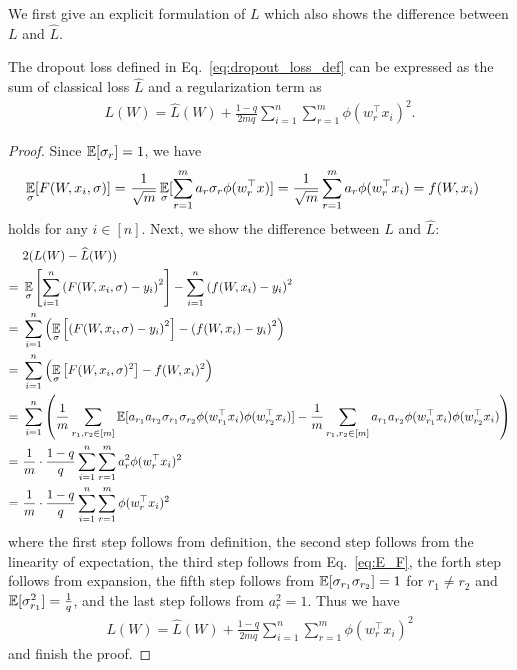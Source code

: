 We first give an explicit formulation of $L$ which also shows the difference between $L$ and $\hat{L}$.%

\begin{lemma}
\label{lem:explicit-regularization}
The dropout loss defined in Eq.~\eqref{eq:dropout_loss_def} can be expressed as the sum of classical loss $\hat{L}$ and a regularization term as
\begin{align}
\label{eq:explicit-regularization}
L(W) = \hat{L}(W) + \frac{1-q}{2mq}\sum_{i=1}^{n} \sum_{r = 1}^{m}\phi(w_r^\top x_i)^{2}.
\end{align}
\end{lemma}

\begin{proof}
Since $\operatorname*{{\mathbb{E}}}[\sigma_r] = 1$, we have
\begin{align}\label{eq:E_F}
    \operatorname*{{\mathbb{E}}}_{\sigma}[F(W, x_i, \sigma)] = & ~ \frac{1}{\sqrt{m}}\operatorname*{{\mathbb{E}}}_{\sigma}[\sum_{r = 1}^{m}a_r \sigma_r\phi(w_{r}^{\top}x)] =  \frac{1}{\sqrt{m}}\sum_{r=1}^{m}a_r\phi(w_r^{\top}x_i) = f(W, x_i)
\end{align}
holds for any $i \in [n]$. Next, we show the difference between $L$ and $\hat{L}$:
\begin{align}
    & ~ 2( L(W) - \widehat{L}(W) ) \notag\\
    = & ~ \operatorname*{{\mathbb{E}}}_{\sigma}\left[\sum_{i = 1}^{n}\left(F(W, x_i, \sigma) - y_i\right)^2\right] -  \sum_{i = 1}^{n}\left(f(W, x_i) - y_i\right)^2\notag\\
    = & ~ \sum_{i = 1}^{n}\left(\operatorname*{{\mathbb{E}}}_{\sigma}\left[\left(F(W, x_i, \sigma) - y_i\right)^2\right] - \left(f(W, x_i) - y_i\right)^2 \right)\notag\\
    = & ~ \sum_{i = 1}^{n}\left(\operatorname*{{\mathbb{E}}}_{\sigma}\left[F(W, x_i, \sigma)^2\right] - f(W, x_i)^2  \right)\notag \\
    = & ~ \sum_{i = 1}^{n}\left(\frac{1}{m}\sum_{r_1, r_2 \in [m]}\operatorname*{{\mathbb{E}}}[a_{r_1}a_{r_2}\sigma_{r_1}\sigma_{r_2}\phi(w_{r_1}^{\top}x_i)\phi(w_{r_2}^{\top}x_i)]- \frac{1}{m}\sum_{r_1, r_2 \in [m]}a_{r_1}a_{r_2}\phi(w_{r_1}^{\top}x_i)\phi(w_{r_2}^{\top}x_i)
    \right)\notag\\
    = & ~ \frac{1}{m}\cdot \frac{1-q}{q}\sum_{i = 1}^{n}\sum_{r=1}^{m}a_r^{2}\phi(w_{r}^{\top}x_i)^2 \notag\\
    = & ~ \frac{1}{m}\cdot \frac{1-q}{q}\sum_{i = 1}^{n}\sum_{r=1}^{m}\phi(w_{r}^{\top}x_i)^2 \label{eq:pb3}
\end{align}
where the first step follows from definition, the second step follows from the linearity of expectation, the third step follows from Eq.~\eqref{eq:E_F}, the forth step follows from expansion, the fifth step follows from $\operatorname*{{\mathbb{E}}}[\sigma_{r_1}\sigma_{r_2}] = 1$ for $r_1 \neq r_2$ and $\operatorname*{{\mathbb{E}}}[\sigma_{r_1}^2] = \frac{1}{q}$, and the last step follows from $a_r^2 = 1$. Thus we have
\begin{align*}
    L(W) = \hat{L}(W) + \frac{1-q}{2mq}\sum_{i = 1}^{n}\sum_{r=1}^{m}\phi(w_{r}^{\top}x_i)^2
\end{align*}
and finish the proof.
\end{proof}



